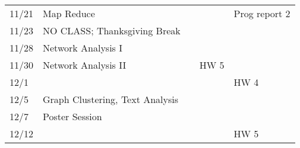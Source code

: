 \documentclass[11pt]{article}
\begin{document}
\begin{centering}
\begin{tabular}{||l|p{3in}|l|l|l||}
11/21 & Map Reduce &  & &Prog report 2\\ 
11/23 & NO CLASS; Thanksgiving Break  & & & \\ 
 \hline

11/28 & Network Analysis I &  & & \\ 
11/30 & Network Analysis II &&HW 5 &\\
12/1 &&&& HW 4\\
\hline 

12/5 & Graph Clustering, Text Analysis  & & & \\ 
12/7 & Poster Session &  &  &\\ 
\hline 
12/12 &&&& HW 5\\

\hline\hline


\end{tabular}\\
\end{centering}
\end{document}
